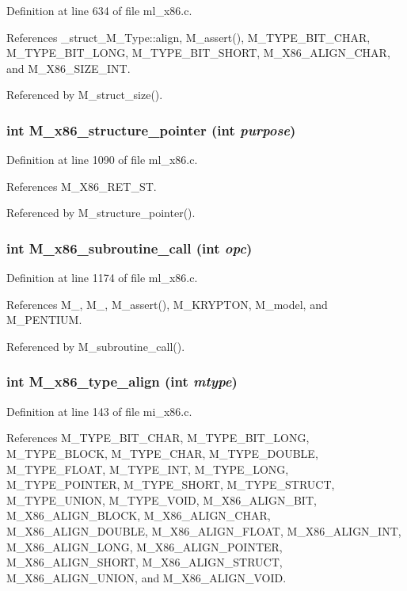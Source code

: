 Definition at line 634 of file ml\_\-x86.c.

References \_\-struct\_\-M\_\-Type::align, M\_\-assert(), M\_\-TYPE\_\-BIT\_\-CHAR, M\_\-TYPE\_\-BIT\_\-LONG, M\_\-TYPE\_\-BIT\_\-SHORT, M\_\-X86\_\-ALIGN\_\-CHAR, and M\_\-X86\_\-SIZE\_\-INT.

Referenced by M\_\-struct\_\-size().
\subsubsection{\setlength{\rightskip}{0pt plus 5cm}int M\_\-x86\_\-structure\_\-pointer (int {\em purpose})}\label{m__x86_8h_7789db024e285b66a3e23ec665f0cdee}




Definition at line 1090 of file ml\_\-x86.c.

References M\_\-X86\_\-RET\_\-ST.

Referenced by M\_\-structure\_\-pointer().
\subsubsection{\setlength{\rightskip}{0pt plus 5cm}int M\_\-x86\_\-subroutine\_\-call (int {\em opc})}\label{m__x86_8h_c0e5d67004b9e6e46317dd4c96a18f6c}




Definition at line 1174 of file ml\_\-x86.c.

References M\_, M\_, M\_\-assert(), M\_\-KRYPTON, M\_\-model, and M\_\-PENTIUM.

Referenced by M\_\-subroutine\_\-call().
\subsubsection{\setlength{\rightskip}{0pt plus 5cm}int M\_\-x86\_\-type\_\-align (int {\em mtype})}\label{m__x86_8h_41c11852de71a65093dfa7b06640e1ba}




Definition at line 143 of file mi\_\-x86.c.

References M\_\-TYPE\_\-BIT\_\-CHAR, M\_\-TYPE\_\-BIT\_\-LONG, M\_\-TYPE\_\-BLOCK, M\_\-TYPE\_\-CHAR, M\_\-TYPE\_\-DOUBLE, M\_\-TYPE\_\-FLOAT, M\_\-TYPE\_\-INT, M\_\-TYPE\_\-LONG, M\_\-TYPE\_\-POINTER, M\_\-TYPE\_\-SHORT, M\_\-TYPE\_\-STRUCT, M\_\-TYPE\_\-UNION, M\_\-TYPE\_\-VOID, M\_\-X86\_\-ALIGN\_\-BIT, M\_\-X86\_\-ALIGN\_\-BLOCK, M\_\-X86\_\-ALIGN\_\-CHAR, M\_\-X86\_\-ALIGN\_\-DOUBLE, M\_\-X86\_\-ALIGN\_\-FLOAT, M\_\-X86\_\-ALIGN\_\-INT, M\_\-X86\_\-ALIGN\_\-LONG, M\_\-X86\_\-ALIGN\_\-POINTER, M\_\-X86\_\-ALIGN\_\-SHORT, M\_\-X86\_\-ALIGN\_\-STRUCT, M\_\-X86\_\-ALIGN\_\-UNION, and M\_\-X86\_\-ALIGN\_\-VOID.

